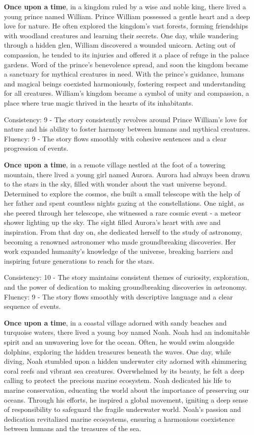 \documentclass{article}
\begin{document}
\textbf{Once upon a time}, in a kingdom ruled by a wise and noble king, there lived a young prince named William. Prince William possessed a gentle heart and a deep love for nature. He often explored the kingdom's vast forests, forming friendships with woodland creatures and learning their secrets. One day, while wandering through a hidden glen, William discovered a wounded unicorn. Acting out of compassion, he tended to its injuries and offered it a place of refuge in the palace gardens. Word of the prince's benevolence spread, and soon the kingdom became a sanctuary for mythical creatures in need. With the prince's guidance, humans and magical beings coexisted harmoniously, fostering respect and understanding for all creatures. William's kingdom became a symbol of unity and compassion, a place where true magic thrived in the hearts of its inhabitants.

Consistency: 9 - The story consistently revolves around Prince William's love for nature and his ability to foster harmony between humans and mythical creatures.
Fluency: 9 - The story flows smoothly with cohesive sentences and a clear progression of events.

\textbf{Once upon a time}, in a remote village nestled at the foot of a towering mountain, there lived a young girl named Aurora. Aurora had always been drawn to the stars in the sky, filled with wonder about the vast universe beyond. Determined to explore the cosmos, she built a small telescope with the help of her father and spent countless nights gazing at the constellations. One night, as she peered through her telescope, she witnessed a rare cosmic event - a meteor shower lighting up the sky. The sight filled Aurora's heart with awe and inspiration. From that day on, she dedicated herself to the study of astronomy, becoming a renowned astronomer who made groundbreaking discoveries. Her work expanded humanity's knowledge of the universe, breaking barriers and inspiring future generations to reach for the stars.

Consistency: 10 - The story maintains consistent themes of curiosity, exploration, and the power of dedication to making groundbreaking discoveries in astronomy.
Fluency: 9 - The story flows smoothly with descriptive language and a clear sequence of events.

\textbf{Once upon a time}, in a coastal village adorned with sandy beaches and turquoise waters, there lived a young boy named Noah. Noah had an indomitable spirit and an unwavering love for the ocean. Often, he would swim alongside dolphins, exploring the hidden treasures beneath the waves. One day, while diving, Noah stumbled upon a hidden underwater city adorned with shimmering coral reefs and vibrant sea creatures. Overwhelmed by its beauty, he felt a deep calling to protect the precious marine ecosystem. Noah dedicated his life to marine conservation, educating the world about the importance of preserving our oceans. Through his efforts, he inspired a global movement, igniting a deep sense of responsibility to safeguard the fragile underwater world. Noah's passion and dedication revitalized marine ecosystems, ensuring a harmonious coexistence between humans and the treasures of the sea.
\end{document}
